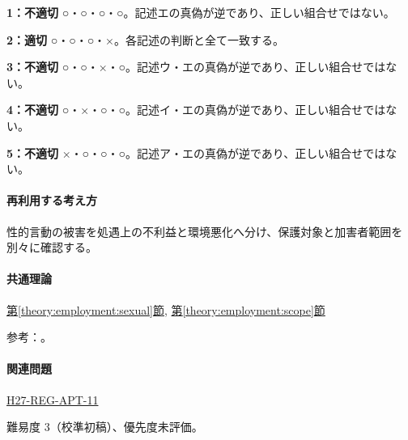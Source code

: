 \noindent\textbf{1：不適切} ○・○・○・○。記述エの真偽が逆であり、正しい組合せではない。\par

\noindent\textbf{2：適切} ○・○・○・×。各記述の判断と全て一致する。\par

\noindent\textbf{3：不適切} ○・○・×・○。記述ウ・エの真偽が逆であり、正しい組合せではない。\par

\noindent\textbf{4：不適切} ○・×・○・○。記述イ・エの真偽が逆であり、正しい組合せではない。\par

\noindent\textbf{5：不適切} ×・○・○・○。記述ア・エの真偽が逆であり、正しい組合せではない。\par

\paragraph{再利用する考え方} 性的言動の被害を処遇上の不利益と環境悪化へ分け、保護対象と加害者範囲を別々に確認する。

\paragraph{共通理論} \hyperref[theory:employment:sexual]{第\ref*{theory:employment:sexual}節}, \hyperref[theory:employment:scope]{第\ref*{theory:employment:scope}節}

\par 参考：\cite{employment_sexual_current,employment_sexual2018,employment_sexual2006}。

\paragraph{関連問題} \hyperref[q:h27-reg-apt-11]{H27-REG-APT-11}

\par 難易度 3（校準初稿）、優先度未評価。
